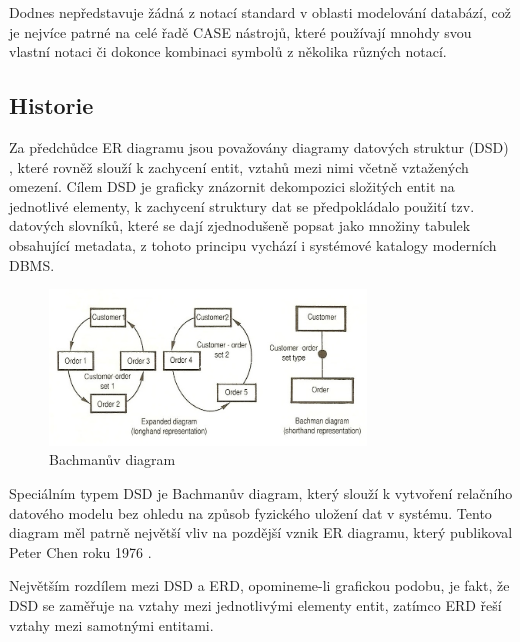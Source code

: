 \documentclass[czech,bachelor,public,dept460,male,oneside]{diploma}
\begin{document}
Dodnes nepředstavuje žádná z notací standard v oblasti modelování databází, což je nejvíce patrné na celé řadě CASE nástrojů, které používají mnohdy svou vlastní notaci či dokonce kombinaci symbolů z několika různých notací.

	\subsection{Historie}
	Za předchůdce ER diagramu jsou považovány diagramy datových struktur (DSD) \cite{bachmanDsd}, které rovněž slouží k zachycení entit, vztahů mezi nimi včetně vztažených omezení. Cílem DSD je graficky znázornit dekompozici složitých entit na jednotlivé elementy, k zachycení struktury dat se předpokládalo použití tzv. datových slovníků, které se dají zjednodušeně popsat jako množiny tabulek obsahující metadata, z tohoto principu vychází i systémové katalogy moderních DBMS.
	
	\begin{figure}[!h]
		\centering
		\includegraphics[width=0.75\textwidth]{Figures/BachmanDiagram}
		\caption[Bachmanův diagram]{Bachmanův diagram \cite{wikiDsd}}
	\end{figure}
	
	Speciálním typem DSD je Bachmanův diagram, který slouží k vytvoření relačního datového modelu bez ohledu na způsob fyzického uložení dat v systému. Tento diagram měl patrně největší vliv na pozdější vznik ER diagramu, který publikoval Peter Chen roku 1976 \cite{chenERD}.
	
	Největším rozdílem mezi DSD a ERD, opomineme-li grafickou podobu, je fakt, že DSD se zaměřuje na vztahy mezi jednotlivými elementy entit, zatímco ERD řeší vztahy mezi samotnými entitami.
	
\end{document}

